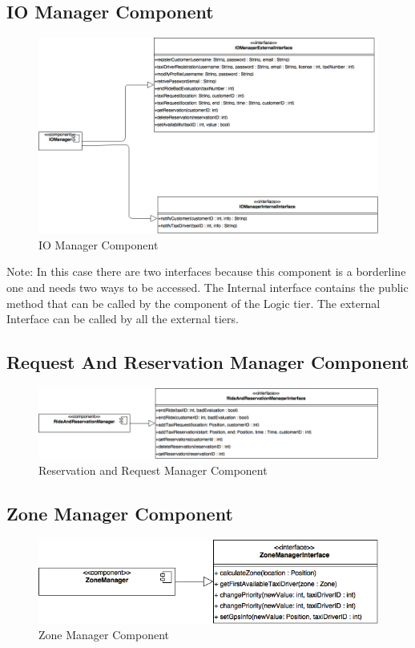 \documentclass[../../../../dd.tex]{subfiles}
\begin{document}
		\subsection{IO Manager Component}
		\begin{figure}[H]
				\centering
				\includegraphics[width=\textwidth, scale=0.5]{../images/IOManagerComponent.png}
			\caption{IO Manager Component}\label{fig:IOMC}
		\end{figure}
		Note: In this case there are two interfaces because this component is a borderline one and needs two ways to be accessed. The Internal interface contains the public method that can be called by the component of the Logic tier. The external Interface can be called by all the external tiers.
	
	\subsection{Request And Reservation Manager Component}
	\begin{figure}[H]
				\centering
				\includegraphics[width=\textwidth, scale=0.5]{../images/RequestAndReservationManager.png}
			\caption{Reservation and Request Manager Component}\label{fig:RARMC}
		\end{figure}
		
		\subsection{Zone Manager Component}
		\begin{figure}[H]
				\centering
				\includegraphics[width=\textwidth, scale=0.5]{../images/ZoneManagerComponent.png}
			\caption{Zone Manager Component}\label{fig:ZMC}
		\end{figure}
		
\end{document}
